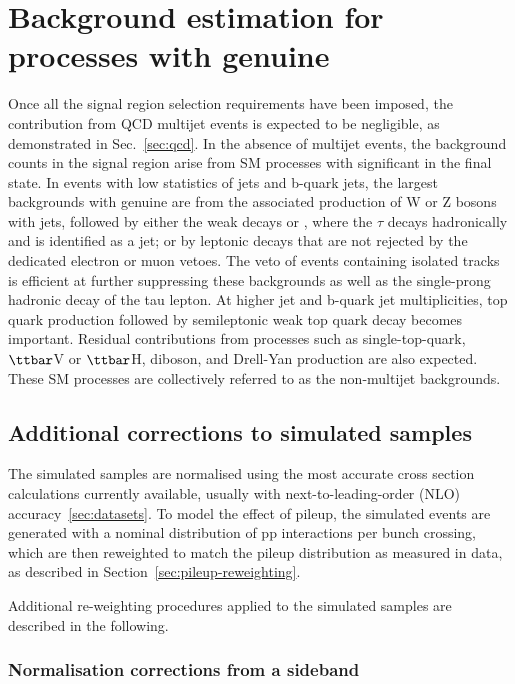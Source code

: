 
\section{Background estimation for processes with genuine \met}
\label{sec:backgroundmet}

Once all the signal region selection requirements have been imposed,
the contribution from QCD multijet events is expected to be
negligible, as demonstrated in Sec.~\ref{sec:qcd}. 
In the absence of multijet events, the background counts in the signal region arise from
SM processes with significant \met in the final state. In events with
low statistics of jets and b-quark jets, the largest backgrounds with
genuine \met are from the associated production of W or Z bosons with
jets, followed by either the weak decays \znunu or \wtaunu, where the
$\tau$ decays hadronically and is identified as a jet; or by leptonic
decays that are not rejected by the dedicated electron or muon
vetoes. The veto of events containing isolated tracks is efficient at
further suppressing these backgrounds as well as the single-prong
hadronic decay of the tau lepton. At higher jet and b-quark jet
multiplicities, top quark production followed by semileptonic weak top
quark decay becomes important.  Residual contributions from processes
such as single-top-quark, $\ttbar$V or $\ttbar$H, diboson, and
Drell-Yan production are also expected. These SM processes are
collectively referred to as the non-multijet backgrounds.

\subsection{Additional corrections to simulated samples}
\label{sec:mc-corrections}

The simulated samples are normalised using the most accurate cross
section calculations currently available, usually with
next-to-leading-order (NLO) accuracy~\ref{sec:datasets}. 
To model the effect of pileup, the simulated events are generated with a nominal distribution
of pp interactions per bunch crossing, which are then reweighted
to match the pileup distribution as measured in data, as described in Section~\ref{sec:pileup-reweighting}.

Additional re-weighting procedures applied to the simulated samples are described in the following.

\subsubsection{Normalisation corrections from a \mht sideband}
\label{sec:sideband-corrections}

